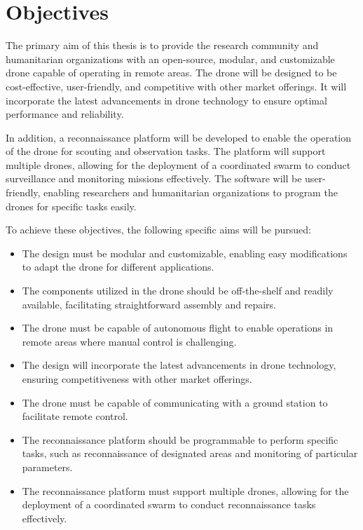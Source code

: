 \chapter{Objectives}\label{ch:objectives}

The primary aim of this thesis is to provide the research community and humanitarian organizations with an open-source, modular, and customizable drone capable of operating in remote areas. The drone will be designed to be cost-effective, user-friendly, and competitive with other market offerings. It will incorporate the latest advancements in drone technology to ensure optimal performance and reliability.

In addition, a reconnaissance platform will be developed to enable the operation of the drone for scouting and observation tasks. The platform will support multiple drones, allowing for the deployment of a coordinated swarm to conduct surveillance and monitoring missions effectively. The software will be user-friendly, enabling researchers and humanitarian organizations to program the drones for specific tasks easily.

To achieve these objectives, the following specific aims will be pursued:

\begin{itemize}
  \item The design must be modular and customizable, enabling easy modifications to adapt the drone for different applications.

  \item The components utilized in the drone should be off-the-shelf and readily available, facilitating straightforward assembly and repairs.

  \item The drone must be capable of autonomous flight to enable operations in remote areas where manual control is challenging.

  \item The design will incorporate the latest advancements in drone technology, ensuring competitiveness with other market offerings.

  \item The drone must be capable of communicating with a ground station to facilitate remote control.

  \item The reconnaissance platform should be programmable to perform specific tasks, such as reconnaissance of designated areas and monitoring of particular parameters.

  \item The reconnaissance platform must support multiple drones, allowing for the deployment of a coordinated swarm to conduct reconnaissance tasks effectively.
\end{itemize}
